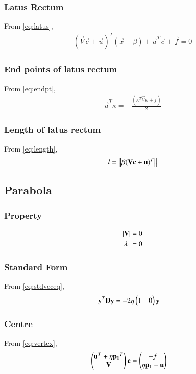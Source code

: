 \documentclass[journal,12pt,twocolumn]{IEEEtran}
\begin{document}
\subsubsection{Latus Rectum}
From \eqref{eq:latus},
\begin{align}
    (\vec{V}\vec{c}+\vec{u})^T(\vec{x} -\beta) + \vec{u}^T\vec{c} + \vec{f} = 0
\end{align}
\subsubsection{End points of latus rectum}
From \eqref{eq:endpt},
\begin{align}
    \vec{u}^T\kappa = -\frac{(\kappa^T\vec{V}\kappa + f )}{2}
\end{align}
\subsubsection{Length of latus rectum}
From \eqref{eq:length},
\begin{align}
   l=\left\lVert\beta(\mathbf{V}\mathbf{c}+\mathbf{u})^T\right\rVert 
\end{align}

\subsection{Parabola}
\subsubsection{Property}
\begin{align}
    \left\vert\mathbf{V}\right\vert = 0
    \\
    \lambda_1=0
\end{align}
\subsubsection{Standard Form}
From \eqref{eq:stdveceq},
\begin{align}
    \mathbf{y}^T\mathbf{D}\mathbf{y} &= -2\eta\begin{pmatrix}1 & 0\end{pmatrix}\mathbf{y} 
\end{align}
\subsubsection{Centre}
From \eqref{eq:vertex},
\begin{align}
    \begin{pmatrix}\mathbf{u}^T + \eta\mathbf{p_1}^T \\ \mathbf{V}\end{pmatrix}\mathbf{c} &= \begin{pmatrix}-f \\ \eta\mathbf{p_1} - \mathbf{u}\end{pmatrix} 
\end{align}
\end{document}
